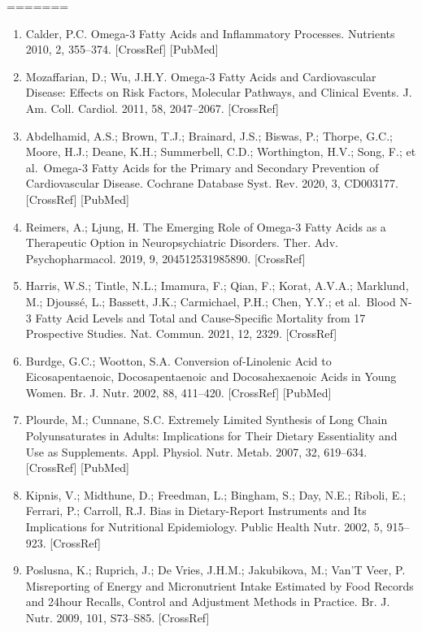 \documentclass[journal=jacsat,manuscript=article]{achemso}
\providecommand{\tightlist}{%
  \setlength{\itemsep}{0pt}\setlength{\parskip}{0pt}}
\begin{document}
=======
\begin{enumerate}
\def\labelenumi{\arabic{enumi}.}
\tightlist
\item
  Calder, P.C. Omega-3 Fatty Acids and Inflammatory Processes. Nutrients
  2010, 2, 355--374. {[}CrossRef{]} {[}PubMed{]}
\item
  Mozaffarian, D.; Wu, J.H.Y. Omega-3 Fatty Acids and Cardiovascular
  Disease: Effects on Risk Factors, Molecular Pathways, and Clinical
  Events. J. Am. Coll. Cardiol. 2011, 58, 2047--2067. {[}CrossRef{]}
\item
  Abdelhamid, A.S.; Brown, T.J.; Brainard, J.S.; Biswas, P.; Thorpe,
  G.C.; Moore, H.J.; Deane, K.H.; Summerbell, C.D.; Worthington, H.V.;
  Song, F.; et al.~Omega-3 Fatty Acids for the Primary and Secondary
  Prevention of Cardiovascular Disease. Cochrane Database Syst. Rev.
  2020, 3, CD003177. {[}CrossRef{]} {[}PubMed{]}
\item
  Reimers, A.; Ljung, H. The Emerging Role of Omega-3 Fatty Acids as a
  Therapeutic Option in Neuropsychiatric Disorders. Ther. Adv.
  Psychopharmacol. 2019, 9, 204512531985890. {[}CrossRef{]}
\item
  Harris, W.S.; Tintle, N.L.; Imamura, F.; Qian, F.; Korat, A.V.A.;
  Marklund, M.; Djoussé, L.; Bassett, J.K.; Carmichael, P.H.; Chen,
  Y.Y.; et al.~Blood N-3 Fatty Acid Levels and Total and Cause-Specific
  Mortality from 17 Prospective Studies. Nat. Commun. 2021, 12, 2329.
  {[}CrossRef{]}
\item
  Burdge, G.C.; Wootton, S.A. Conversion of-Linolenic Acid to
  Eicosapentaenoic, Docosapentaenoic and Docosahexaenoic Acids in Young
  Women. Br. J. Nutr. 2002, 88, 411--420. {[}CrossRef{]} {[}PubMed{]}
\item
  Plourde, M.; Cunnane, S.C. Extremely Limited Synthesis of Long Chain
  Polyunsaturates in Adults: Implications for Their Dietary Essentiality
  and Use as Supplements. Appl. Physiol. Nutr. Metab. 2007, 32,
  619--634. {[}CrossRef{]} {[}PubMed{]}
\item
  Kipnis, V.; Midthune, D.; Freedman, L.; Bingham, S.; Day, N.E.;
  Riboli, E.; Ferrari, P.; Carroll, R.J. Bias in Dietary-Report
  Instruments and Its Implications for Nutritional Epidemiology. Public
  Health Nutr. 2002, 5, 915--923. {[}CrossRef{]}
\item
  Poslusna, K.; Ruprich, J.; De Vries, J.H.M.; Jakubikova, M.; Van'T
  Veer, P. Misreporting of Energy and Micronutrient Intake Estimated by
  Food Records and 24hour Recalls, Control and Adjustment Methods in
  Practice. Br. J. Nutr. 2009, 101, S73--S85. {[}CrossRef{]}

\end{enumerate}
\end{document}
